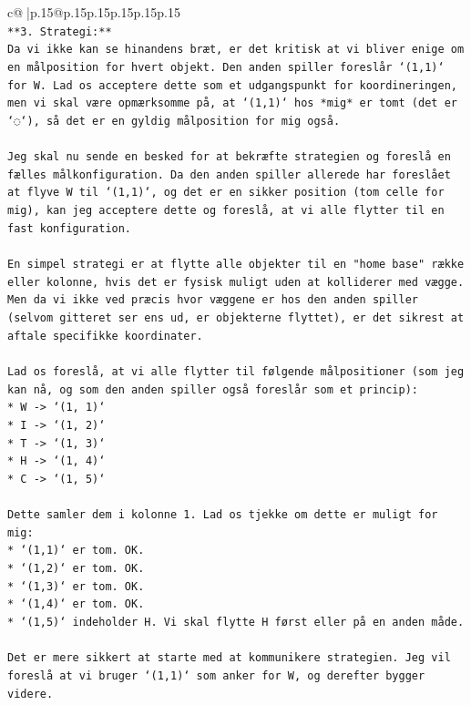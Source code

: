 \documentclass{article}
\begin{document}
{\begin{supertabular}{c@{$\;$}|p{.15\linewidth}@{}p{.15\linewidth}p{.15\linewidth}p{.15\linewidth}p{.15\linewidth}p{.15\linewidth}}
{{{\\ 
\texttt{**3. Strategi:**} \\
\texttt{Da vi ikke kan se hinandens bræt, er det kritisk at vi bliver enige om en målposition for hvert objekt. Den anden spiller foreslår `(1,1)` for W. Lad os acceptere dette som et udgangspunkt for koordineringen, men vi skal være opmærksomme på, at `(1,1)` hos *mig* er tomt (det er `◌`), så det er en gyldig målposition for mig også.} \\
\\ 
\texttt{Jeg skal nu sende en besked for at bekræfte strategien og foreslå en fælles målkonfiguration. Da den anden spiller allerede har foreslået at flyve W til `(1,1)`, og det er en sikker position (tom celle for mig), kan jeg acceptere dette og foreslå, at vi alle flytter til en fast konfiguration.} \\
\\ 
\texttt{En simpel strategi er at flytte alle objekter til en "home base" række eller kolonne, hvis det er fysisk muligt uden at kolliderer med vægge. Men da vi ikke ved præcis hvor væggene er hos den anden spiller (selvom gitteret ser ens ud, er objekterne flyttet), er det sikrest at aftale specifikke koordinater.} \\
\\ 
\texttt{Lad os foreslå, at vi alle flytter til følgende målpositioner (som jeg kan nå, og som den anden spiller også foreslår som et princip):} \\
\texttt{*   W {-}> `(1, 1)`} \\
\texttt{*   I {-}> `(1, 2)`} \\
\texttt{*   T {-}> `(1, 3)`} \\
\texttt{*   H {-}> `(1, 4)`} \\
\texttt{*   C {-}> `(1, 5)`} \\
\\ 
\texttt{Dette samler dem i kolonne 1. Lad os tjekke om dette er muligt for mig:} \\
\texttt{*   `(1,1)` er tom. OK.} \\
\texttt{*   `(1,2)` er tom. OK.} \\
\texttt{*   `(1,3)` er tom. OK.} \\
\texttt{*   `(1,4)` er tom. OK.} \\
\texttt{*   `(1,5)` indeholder H. Vi skal flytte H først eller på en anden måde.} \\
\\ 
\texttt{Det er mere sikkert at starte med at kommunikere strategien. Jeg vil foreslå at vi bruger `(1,1)` som anker for W, og derefter bygger videre.} \\
}}}
\end{supertabular}}
\end{document}
